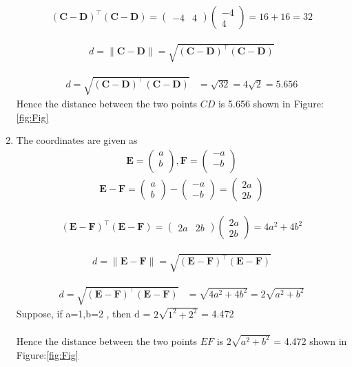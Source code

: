 \documentclass[12pt]{article}
\providecommand{\brak}[1]{\ensuremath{\left(#1\right)}}
\newcommand{\myvec}[1]{\ensuremath{\begin{pmatrix}#1\end{pmatrix}}}
\let\vec\mathbf
\begin{document}
\begin{enumerate}
	
	
	\begin{align}
		(\vec{C}-\vec{D})^\top (\vec{C}-\vec{D}) = \myvec{-4&4} \myvec{-4\\4} = 16+16 = 32
	\end{align}
	
	\begin{align}
		d=\lVert \vec{C}-\vec{D} \rVert=\sqrt{\brak{\vec{C} -\vec{D}}^{\top}\brak{\vec{C} -\vec{D}}}
	\end{align}

\begin{align}
d=\sqrt{\brak{\vec{C} -\vec{D}}^{\top}\brak{\vec{C} -\vec{D}}}
 &=\sqrt{32}=4\sqrt{2}=5.656
\end{align}	
	Hence the distance between the two points $CD$ is 5.656 shown in Figure:\ref{fig:Fig}
	

	
\item The coordinates are given as
	\begin{align}
	\vec{E} = \myvec{
		a\\
		b\\
		},
	\vec{F} = \myvec{
		-a\\
		-b\\
		}
	\end{align}
	\begin{align}
		\vec{E} - \vec{F} = \myvec{a\\b} - \myvec{-a\\-b} = \myvec{2a\\2b}		
	\end{align}
	
	
	
	\begin{align}
		(\vec{E}-\vec{F})^\top (\vec{E}-\vec{F}) = \myvec{2a&2b} \myvec{2a\\2b} = 4a^2+4b^2 
	\end{align}
	
	\begin{align}
		d=\lVert \vec{E}-\vec{F} \rVert=\sqrt{\brak{\vec{E} -\vec{F}}^{\top}\brak{\vec{E} -\vec{F}}}
	\end{align}

\begin{align}
d=\sqrt{\brak{\vec{E} -\vec{F}}^{\top}\brak{\vec{E} -\vec{F}}}
 &=\sqrt{4a^2+4b^2 }=2\sqrt{a^2+b^2}
\end{align}	
 Suppose, if a=1,b=2 , then d = $2\sqrt{1^2+2^2}$ = 4.472\\
	\\Hence the distance between the two points $EF$ is $2\sqrt{a^2+b^2}$ = 4.472 shown in Figure:\ref{fig:Fig}


\end{enumerate}
\end{document}
